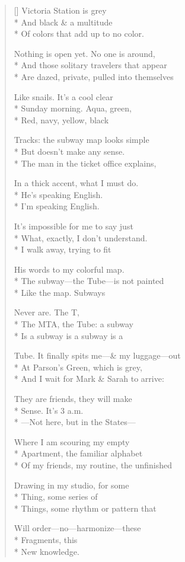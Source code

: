 \label{ch:subway_maps}
\settowidth{\versewidth}{Tube. It finally spits me—\& my luggage—out}
\begin{verse}[\versewidth]
Victoria Station is grey\\*
And black \& a multitude\\*
Of colors that add up to no color.

Nothing is open yet.   No one is around,\\*
And those solitary travelers that appear\\*
Are dazed, private, pulled into themselves

Like snails.   It's a cool clear\\*
Sunday morning.  Aqua, green,\\*
Red, navy, yellow, black

Tracks: the subway map looks simple\\*
But doesn't make any sense.\\*
The man in the ticket office explains,

In a thick accent, what I must do.\\*
He's speaking English.\\*
I'm speaking English.

It's impossible for me to say just\\*
What, exactly, I don't understand.\\*
I walk away, trying to fit

His words to my colorful map.\\*
The subway---the Tube---is not painted\\*
Like the map.     Subways

Never are. The T,\\*
The MTA, the Tube: a subway\\*
Is a subway is a subway is a

Tube. It finally spits me---\& my luggage---out\\*
At Parson's Green, which is grey,\\*
And I wait for Mark \& Sarah to arrive:

They are friends, they will make\\*
Sense. It's 3 a.m.\\*
---Not here, but in the States---

Where I am scouring my empty\\*
Apartment, the familiar alphabet\\*
Of my friends, my routine, the unfinished

Drawing in my studio, for some\\*
Thing, some series of\\*
Things, some rhythm or pattern that

Will order---no---harmonize---these\\*
Fragments, this\\*
New knowledge.
\end{verse}
